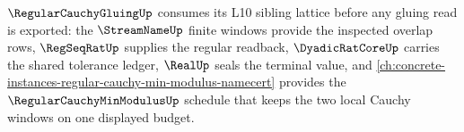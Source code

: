 $\RegularCauchyGluingUp$ consumes its L10 sibling lattice before any gluing read is exported: the $\StreamNameUp$ finite windows provide the inspected overlap rows, $\RegSeqRatUp$ supplies the regular readback, $\DyadicRatCoreUp$ carries the shared tolerance ledger, $\RealUp$ seals the terminal value, and \autoref{ch:concrete-instances-regular-cauchy-min-modulus-namecert} provides the $\RegularCauchyMinModulusUp$ schedule that keeps the two local Cauchy windows on one displayed budget.

